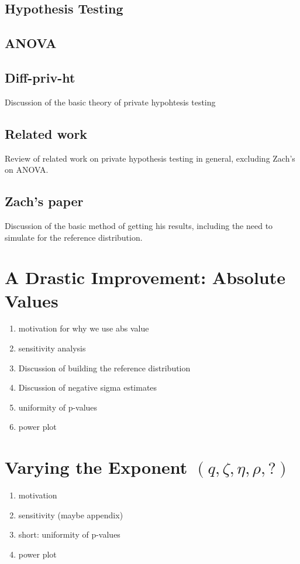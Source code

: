\documentclass[11pt, oneside]{article}
\begin{document}
\subsection{Hypothesis Testing}
\subsection{ANOVA}
\subsection{Diff-priv-ht}
Discussion of the basic theory of private hypohtesis testing
\subsection{Related work}
Review of related work on private hypothesis testing in general, excluding Zach's on ANOVA.
\subsection{Zach's paper}
Discussion of the basic method of getting his results, including the need to simulate for the reference distribution.


\section{A Drastic Improvement: Absolute Values}
\begin{enumerate}
\item motivation for why we use abs value
\item sensitivity analysis
\item Discussion of building the reference distribution
\item Discussion of negative sigma estimates
\item uniformity of p-values
\item power plot
\end{enumerate}

\section{Varying the Exponent $(q, \zeta, \eta, \rho, ?)$}
\begin{enumerate}
\item motivation
\item sensitivity (maybe appendix)
\item short: uniformity of p-values
\item power plot
\end{enumerate}
\end{document}
